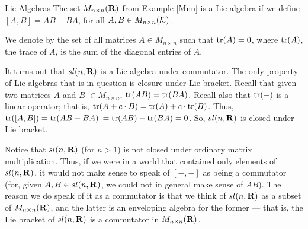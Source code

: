 \begin{section}{Lie Algebras}
The set $M_{n \times n}(\mathbf{R})$ from Example \ref{Mnn} is a Lie algebra if we define $[A,B] = AB - BA$, for all $A, B \in M_{n \times n}(\mathcal{K})$.

\begin{definition}
\label{slla}
We denote by  the set of all matrices $A \in M_{n \times n}$ such that $\mathrm{tr}(A) = 0$, where $\mathrm{tr}(A)$, the trace of $A$, is the sum of the diagonal entries of $A$.
\end{definition}

It turns out that $sl(n,\mathbf{R})$ is a Lie algebra under commutator.  The only property of Lie algebras that is in question is closure under Lie bracket.  Recall that given two matrices $A$ and $B$ $\in M_{n \times n}$, $\mathrm{tr}(AB) = \mathrm{tr}(BA)$.  Recall also that $\mathrm{tr}(-)$ is a linear operator; that is, $\mathrm{tr}(A + c \cdot B) = \mathrm{tr}(A) + c \cdot \mathrm{tr}(B)$.  Thus, $\mathrm{tr}([A,B]) = \mathrm{tr}(AB - BA)$ $= \mathrm{tr}(AB) - \mathrm{tr}(BA) = 0$.  So, $sl(n, \mathbf{R})$ is closed under Lie bracket.

\eex

Notice that $sl(n,\mathbf{R})$ (for $n > 1$) is not closed under ordinary matrix multiplication.  Thus, if we were in a world that contained only elements of $sl(n,\mathbf{R})$, it would not make sense to speak of $[-,-]$ as being a commutator (for, given $A,B \in sl(n,\mathbf{R})$, we could not in general make sense of $AB$).  The reason we do speak of it as a commutator is that we think of $sl(n,\mathbf{R})$ as a subset of $M_{n \times n}(\mathbf{R})$, and the latter is an enveloping algebra for the former --- that is, the Lie bracket of $sl(n,\mathbf{R})$ is a commutator in $M_{n \times n}(\mathbf{R})$.

\end{section}

